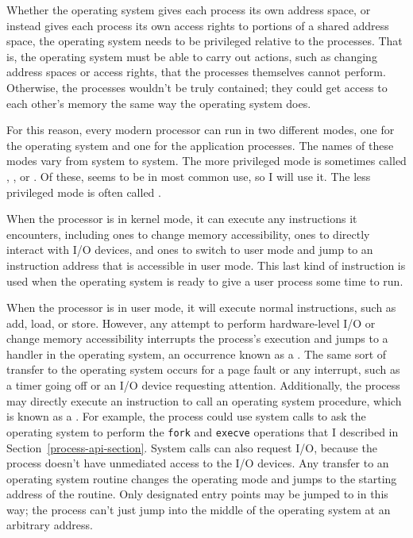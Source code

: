 Whether the operating system gives each process its own address space,
or instead gives each process its own access rights to portions of a
shared address space, the operating system needs to be privileged
relative to the processes.  That is, the operating system must be able
to carry out actions, such as changing
address spaces or access rights, that the processes themselves cannot perform.  Otherwise, the processes wouldn't be
truly contained; they could get access to each other's memory the same
way the operating system does.

For this reason, every modern processor can run in two different
modes, one for the operating system and one for the application
processes.  The names of these modes vary from system to system.  The
more privileged mode is sometimes called ,
, or .  Of
these,  seems to be in most common use, so I will
use it.  The
less privileged mode is often called .

When the processor is in kernel mode, it can execute any instructions
it encounters, including ones to change memory accessibility, ones to
directly interact with I/O devices, and ones to switch to user mode and
jump to an instruction address that is accessible in user mode.  This
last kind of instruction is used when the operating system is ready to give a
user process some time to run.

When the processor is in user mode, it will execute normal
instructions, such as add, load, or store.  However, any attempt to
perform hardware-level I/O or change memory accessibility interrupts
the process's execution and jumps to a handler in the operating
system, an occurrence known as a .  The same sort of transfer to the operating system occurs for
a page fault or any interrupt, such as a timer going off or an I/O
device requesting attention.  Additionally, the process may directly
execute an instruction to call an operating system procedure, which is
known as
a .  For example, the process could use system
calls to ask
the operating system to perform the
\verb|fork| and \verb|execve| operations that I described in Section~\ref{process-api-section}.  System calls can also request
I/O, because the process doesn't have unmediated access to the I/O
devices.  Any transfer to an operating system routine changes the
operating mode and jumps to the starting address of the routine.  Only
designated entry points may be jumped to in this way; the process
can't just jump into the middle of the operating system at an
arbitrary address.

